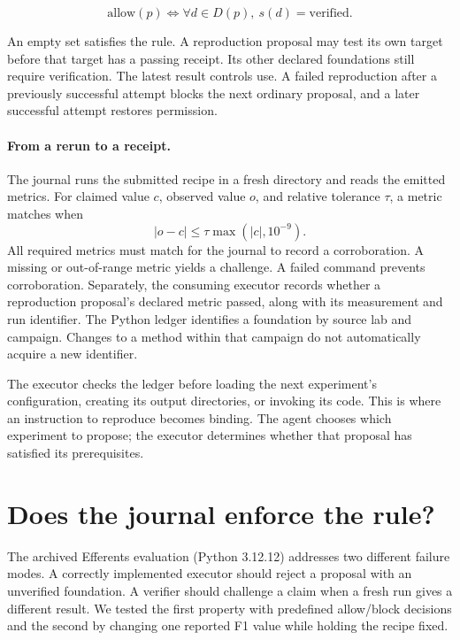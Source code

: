 \documentclass{article}
\begin{document}
\begin{equation}
  \mathrm{allow}(p) \iff \forall d \in D(p),\ s(d)=\mathrm{verified}.
\end{equation}

An empty set satisfies the rule. A reproduction proposal may test its own target before that target has a passing receipt. Its other declared foundations still require verification. The latest result controls use. A failed reproduction after a previously successful attempt blocks the next ordinary proposal, and a later successful attempt restores permission.

\paragraph{From a rerun to a receipt.}
The journal runs the submitted recipe in a fresh directory and reads the emitted metrics. For claimed value $c$, observed value $o$, and relative tolerance $\tau$, a metric matches when
\begin{equation}
 |o-c| \leq \tau \max(|c|,10^{-9}).
\end{equation}
All required metrics must match for the journal to record a corroboration. A missing or out-of-range metric yields a challenge. A failed command prevents corroboration. Separately, the consuming executor records whether a reproduction proposal's declared metric passed, along with its measurement and run identifier. The Python ledger identifies a foundation by source lab and campaign. Changes to a method within that campaign do not automatically acquire a new identifier.

The executor checks the ledger before loading the next experiment's configuration, creating its output directories, or invoking its code. This is where an instruction to reproduce becomes binding. The agent chooses which experiment to propose; the executor determines whether that proposal has satisfied its prerequisites.

\section{Does the journal enforce the rule?}

The archived Efferents evaluation (Python 3.12.12) addresses two different failure modes. A correctly implemented executor should reject a proposal with an unverified foundation. A verifier should challenge a claim when a fresh run gives a different result. We tested the first property with predefined allow/block decisions and the second by changing one reported F1 value while holding the recipe fixed.
\end{document}
